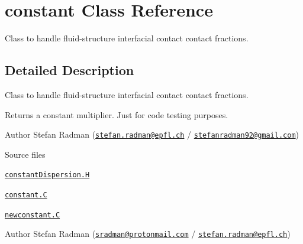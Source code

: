 \hypertarget{classFoam_1_1constant}{}\section{constant Class Reference}
\label{classFoam_1_1constant}


Class to handle fluid-\/structure interfacial contact contact fractions.  




\subsection{Detailed Description}
Class to handle fluid-\/structure interfacial contact contact fractions. 

Returns a constant multiplier. Just for code testing purposes.

\label{_Description}%
 Author Stefan Radman (\href{mailto:stefan.radman@epfl.ch}{\tt stefan.\+radman@epfl.\+ch} / \href{mailto:stefanradman92@gmail.com}{\tt stefanradman92@gmail.\+com})

\begin{DoxyParagraph}{Source files}

\begin{DoxyItemize}
\item \href{../../../home/carlo/data/GeN-Foam/GeN-Foam_ffn/GeN-Foam/GeN-Foam/classes/thermalHydraulics/src/physicsModels/dispersionModels/constant/constantDispersion.H}{\tt constant\+Dispersion.\+H} 
\item \href{../../../home/carlo/data/GeN-Foam/GeN-Foam_ffn/GeN-Foam/GeN-Foam/classes/thermalHydraulics/src/physicsModels/dispersionModels/constant/constant.C}{\tt constant.\+C} 
\item \href{../../../home/carlo/data/GeN-Foam/GeN-Foam_ffn/GeN-Foam/GeN-Foam/classes/thermalHydraulics/src/physicsModels/dispersionModels/constant/newconstant.C}{\tt newconstant.\+C} 
\end{DoxyItemize}
\end{DoxyParagraph}
\label{_Description}%
 Author Stefan Radman (\href{mailto:sradman@protonmail.com}{\tt sradman@protonmail.\+com} / \href{mailto:stefan.radman@epfl.ch}{\tt stefan.\+radman@epfl.\+ch})

